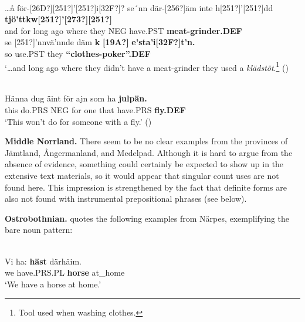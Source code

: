 \ea \label{} 
\\
\gll …å  för-[26D?][251?]’[251?]i[32F?]?  se´nn  där-[256?]äm  inte  h[251?]’[251?]dd  \textbf{tjö’ttkw[251?]’[273?][251?]}\\
and  for long  ago  where they  NEG  have.PST  \textbf{meat-grinder.DEF}\\
\gll se  [251?]’nnvä’nnde  däm  \textbf{k} \textbf{[19A?]} \textbf{e’sta’i[32F?]t’n.}\\
so  use.PST  they  \textbf{“clothes-poker”.DEF}\\
\glt ‘…and long ago where they didn’t have a meat-grinder they used a \textit{klädstöt}.\footnote{ Tool used when washing clothes.} (\citet[303]{Westerberg2004})

\z

\ea \label{} 
\\
\gll Hänna  dug  äint  för  ajn  som  ha  \textbf{julpän.} \\
this  do.PRS  NEG  for  one  that  have.PRS  \textbf{fly.DEF} \\
\glt ‘This won’t do for someone with a fly.’ (\citet[94]{Westerlund1978})

\z

\textbf{Middle Norrland.} There seem to be no clear examples from the provinces of Jämtland, Ångermanland, and Medelpad. Although it is hard to argue from the absence of evidence, something could certainly be expected to show up in the extensive text materials, so it would appear that singular count uses are not found here. This impression is strengthened by the fact that definite forms are also not found with instrumental prepositional phrases (see below). 


\textbf{Ostrobothnian.} \citet[207]{Nikula1997} quotes the following examples from Närpes, exemplifying the bare noun pattern:


\ea\label{}
\\
\gll Vi  ha:  \textbf{häst} därhäim.\\
we  have.PRS.PL  \textbf{horse} at\_home\\
\glt ‘We have a horse at home.’

